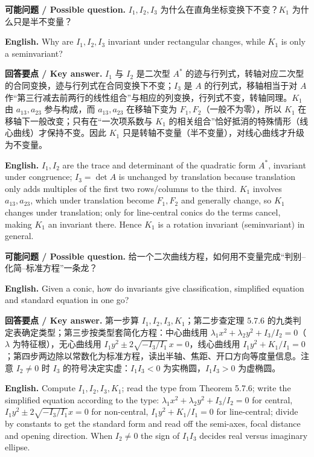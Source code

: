\documentclass[UTF8,11pt,a4paper]{ctexart}
\newcommand{\EN}[1]{\par\noindent \textbf{English.} #1\par}
\newcommand{\ASK}[4]{\par\noindent \textbf{可能问题 / Possible question.} #1\par\EN{#2}\noindent \textbf{回答要点 / Key answer.} #3\par\EN{#4}\medskip}
\theoremstyle{definition}
\begin{document}
\ASK{$I_1,I_2,I_3$ 为什么在直角坐标变换下不变？$K_1$ 为什么只是半不变量？}{Why are $I_1,I_2,I_3$ invariant under rectangular changes, while $K_1$ is only a seminvariant?}{$I_1$ 与 $I_2$ 是二次型 $A^*$ 的迹与行列式，转轴对应二次型的合同变换，迹与行列式在合同变换下不变；$I_3$ 是 $A$ 的行列式，移轴相当于对 $A$ 作``第三行减去前两行的线性组合''与相应的列变换，行列式不变，转轴同理。$K_1$ 由 $a_{13},a_{23}$ 参与构成，而 $a_{13},a_{23}$ 在移轴下变为 $F_1,F_2$（一般不为零），所以 $K_1$ 在移轴下一般改变；只有在``一次项系数与 $K_1$ 的相关组合''恰好抵消的特殊情形（线心曲线）才保持不变。因此 $K_1$ 只是转轴不变量（半不变量），对线心曲线才升级为不变量。}{$I_1,I_2$ are the trace and determinant of the quadratic form $A^*$, invariant under congruence; $I_3=\det A$ is unchanged by translation because translation only adds multiples of the first two rows/columns to the third. $K_1$ involves $a_{13},a_{23}$, which under translation become $F_1,F_2$ and generally change, so $K_1$ changes under translation; only for line-central conics do the terms cancel, making $K_1$ an invariant there. Hence $K_1$ is a rotation invariant (seminvariant) in general.}

\ASK{给一个二次曲线方程，如何用不变量完成``判别--化简--标准方程''一条龙？}{Given a conic, how do invariants give classification, simplified equation and standard equation in one go?}{第一步算 $I_1,I_2,I_3,K_1$；第二步查定理 5.7.6 的九类判定表确定类型；第三步按类型套简化方程：中心曲线用 $\lambda_1x^2+\lambda_2y^2+I_3/I_2=0$（$\lambda$ 为特征根），无心曲线用 $I_1y^2\pm2\sqrt{-I_3/I_1}\,x=0$，线心曲线用 $I_1y^2+K_1/I_1=0$；第四步两边除以常数化为标准方程，读出半轴、焦距、开口方向等度量信息。注意 $I_2\ne0$ 时 $I_3$ 的符号决定实虚：$I_1I_3<0$ 为实椭圆，$I_1I_3>0$ 为虚椭圆。}{Compute $I_1,I_2,I_3,K_1$; read the type from Theorem 5.7.6; write the simplified equation according to the type: $\lambda_1x^2+\lambda_2y^2+I_3/I_2=0$ for central, $I_1y^2\pm2\sqrt{-I_3/I_1}x=0$ for non-central, $I_1y^2+K_1/I_1=0$ for line-central; divide by constants to get the standard form and read off the semi-axes, focal distance and opening direction. When $I_2\ne0$ the sign of $I_1I_3$ decides real versus imaginary ellipse.}
\end{document}
